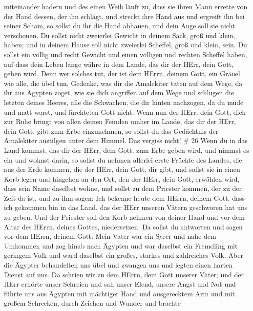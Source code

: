 miteinander hadern und des einen Weib läuft zu, dass sie ihren Mann
errette von der Hand dessen, der ihn schlägt, und streckt ihre Hand aus
und ergreift ihn bei seiner Scham,  so sollst du ihr die
Hand abhauen, und dein Auge soll sie nicht verschonen.  Du
sollst nicht zweierlei Gewicht in deinem Sack, groß und klein, haben;
 und in deinem Hause soll nicht zweierlei Scheffel, groß
und klein, sein.  Du sollst ein völlig und recht Gewicht
und einen völligen und rechten Scheffel haben, auf dass dein Leben lange
währe in dem Lande, das dir der HErr, dein Gott, geben wird.
 Denn wer solches tut, der ist dem HErrn, deinem Gott, ein
Gräuel wie alle, die übel tun.  Gedenke, was dir die
Amalekiter taten auf dem Wege, da ihr aus Ägypten zoget, 
wie sie dich angriffen auf dem Wege und schlugen die letzten deines
Heeres, alle die Schwachen, die dir hinten nachzogen, da du müde und
matt warst, und fürchteten Gott nicht.  Wenn nun der HErr,
dein Gott, dich zur Ruhe bringt von allen deinen Feinden umher im Lande,
das dir der HErr, dein Gott, gibt zum Erbe einzunehmen, so sollst du das
Gedächtnis der Amalekiter austilgen unter dem Himmel. Das vergiss nicht!
\# 26  Wenn du in das Land kommst, das dir der HErr, dein
Gott, zum Erbe geben wird, und nimmst es ein und wohnst darin,
 so sollst du nehmen allerlei erste Früchte des Landes, die
aus der Erde kommen, die der HErr, dein Gott, dir gibt, und sollst sie
in einen Korb legen und hingehen an den Ort, den der HErr, dein Gott,
erwählen wird, dass sein Name daselbst wohne,  und sollst zu
dem Priester kommen, der zu der Zeit da ist, und zu ihm sagen: Ich
bekenne heute dem HErrn, deinem Gott, dass ich gekommen bin in das Land,
das der HErr unseren Vätern geschworen hat uns zu geben. 
Und der Priester soll den Korb nehmen von deiner Hand und vor dem Altar
des HErrn, deines Gottes, niedersetzen.  Da sollst du
antworten und sagen vor dem HErrn, deinem Gott: Mein Vater war ein Syrer
und nahe dem Umkommen und zog hinab nach Ägypten und war daselbst ein
Fremdling mit geringem Volk und ward daselbst ein großes, starkes und
zahlreiches Volk.  Aber die Ägypter behandelten uns übel und
zwangen uns und legten einen harten Dienst auf uns.  Da
schrien wir zu dem HErrn, dem Gott unserer Väter; und der HErr erhörte
unser Schreien und sah unser Elend, unsere Angst und Not 
und führte uns aus Ägypten mit mächtiger Hand und ausgerecktem Arm und
mit großem Schrecken, durch Zeichen und Wunder  und brachte
